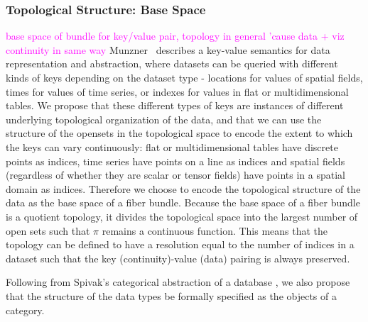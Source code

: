\documentclass[journal]{IEEEtran}
\newcommand{\note}[1]{\textcolor{magenta}{#1}}
\theoremstyle{definition}
\theoremstyle{remark}
\begin{document}
\subsubsection{Topological Structure: Base Space \dbase}
\label{sec:atct:fb:base}
\note{base space of bundle for key/value pair, topology in general 'cause data + viz continuity in same way}
Munzner~\cite{munznerChDataAbstraction} describes a key-value semantics for data representation and abstraction, where datasets can be queried with different kinds of keys depending on the dataset type - locations for values of spatial fields, times for values of time series, or indexes for values in flat or multidimensional tables.
We propose that these different types of keys are instances of different underlying topological organization of the data, and that we can use the structure of the opensets in the topological space to encode the extent to which the keys can vary continuously: flat or multidimensional tables have discrete points as indices, time series have points on a line as indices and spatial fields (regardless of whether they are scalar or tensor fields) have points in a spatial domain as indices. Therefore we choose to encode the topological structure of the data as the \textcolor{base}{base space} of a fiber bundle. Because the base space of a fiber bundle is a quotient topology\cite{munkresElementsAlgebraicTopology1984}, it divides the topological space into the largest number of open sets such that $\pi$ remains a continuous function. This means that the topology can be defined to have a resolution equal to the number of indices in a dataset such that the key (continuity)-value (data) pairing is always preserved. 

Following from Spivak's categorical abstraction of a database \cite{spivakSimplicialDatabases2009,spivakDatabasesAreCategories2010}, we also propose that the structure of the data types be formally specified as the objects of a category.
\end{document}
